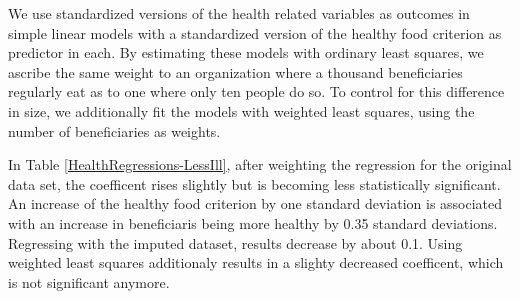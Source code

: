 \documentclass[12pt, a4paper, titlepage]{article}\usepackage[]{graphicx}\usepackage[]{color}
\begin{document}
We use standardized versions of the health related variables as outcomes in simple linear models with a standardized version of the healthy food criterion as predictor in each.
By estimating these models with ordinary least squares, we ascribe the same weight to an organization where a thousand beneficiaries regularly eat as to one where only ten people do so. To control for this difference in size, we additionally fit the models with weighted least squares, using the number of beneficiaries as weights.

In Table \ref{HealthRegressions-LessIll}, after weighting the regression for the original data set, the coefficent rises slightly but is becoming less statistically significant. An increase of the healthy food criterion by one standard deviation is associated with an increase in beneficiaris being more healthy by 0.35 standard deviations. Regressing with the imputed dataset, results decrease by about 0.1. Using weighted least squares additionaly results in a slighty decreased coefficent, which is not significant anymore.    


\begin{table}
\begin{center}
\caption{Regression Results: Less Ill}
\label{HealthRegressions-LessIll}
\end{center}
\end{table}
\end{document}
